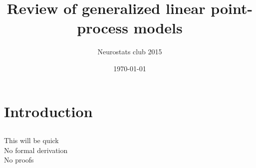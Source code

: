 \documentclass[svgnames,13pt]{beamer}
\begin{document}
\title   {Review of generalized linear point-process models}
\author  {Neurostats club 2015}
\subtitle{}
\date    {\today}
\begin{frame} \titlepage \end{frame}

\section{Introduction}


\subsection{}

\begin{frame}{}
\begin{center}
	\large This will be quick\\
	No formal derivation\\
	No proofs
\end{center}
\end{frame} 
\end{document}
